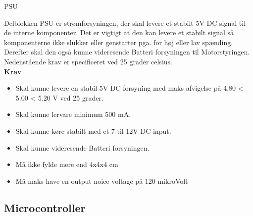 \begin{PartBlokDescription}{PSU}{}
\BlokSpacer{0cm}
\end{PartBlokDescription}

Delblokken PSU er strømforsyningen, der skal levere et stabilt 5V DC signal til de interne komponenter. Det er vigtigt at den kan levere et stabilt signal så komponenterne ikke slukker eller genstarter pga. for høj eller lav spænding.
Derefter skal den også kunne videresende Batteri forsyningen til Motorstyringen.
Nedenstående krav er specificeret ved 25 grader celsius. 
\\
\textbf{Krav}
\begin{itemize}
\item Skal kunne levere en stabil 5V DC forsyning  med maks afvigelse på  4.80 < 5.00 < 5.20 V ved 25 grader.
\item Skal kunne lervare minimum 500 mA.
\item Skal kunne køre stabilt med et 7 til 12V DC input.
\item Skal kunne videresende Batteri forsyningen.
\item Må ikke fylde mere end 4x4x4 cm
\item Må maks have en output noice voltage på 120 mikroVolt
\end{itemize}

\subsection{Microcontroller}


